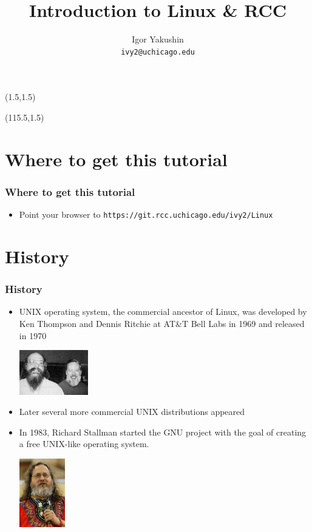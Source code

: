 \documentclass{beamer}
\title{\huge{Introduction to Linux \& RCC}}
\author{Igor Yakushin \\ \texttt{ivy2@uchicago.edu}}
\newcommand{\RCCLogo}{
\begin{textblock}{14}(1.5,1.5)
  \pgfuseimage{logo_rcc}
\end{textblock}
}
\newcommand{\TUX}{
\begin{textblock}{14}(115.5,1.5)
  \pgfuseimage{tux}
\end{textblock}
}
\begin{document}



\begin{frame}
\RCCLogo
\TUX
\titlepage
\end{frame}

\section{Where to get this tutorial}
\begin{frame}[fragile]
  \frametitle{Where to get this tutorial}
  \begin{itemize}
  \item Point your browser to  {\color{mycolorcli}\verb|https://git.rcc.uchicago.edu/ivy2/Linux|}
  \end{itemize}
\end{frame}

\section{History}
\begin{frame}[fragile]
  \frametitle{History}
  \begin{itemize}
  \item UNIX operating system, the commercial ancestor of Linux, was developed by Ken Thompson and Dennis Ritchie at AT\&T Bell Labs in 1969 and released in 1970
\begin{center}
\includegraphics[width=3cm]{graphs/Ken_n_dennis.jpg}
\end{center}
  \item Later several more commercial UNIX distributions appeared
  \item In 1983, Richard Stallman started the GNU project with the goal of creating a free UNIX-like operating system.
\begin{center}
\includegraphics[width=2cm]{graphs/Richard_Stallman.jpg}
\end{center}
\end{itemize}
\end{frame}
\end{document}
